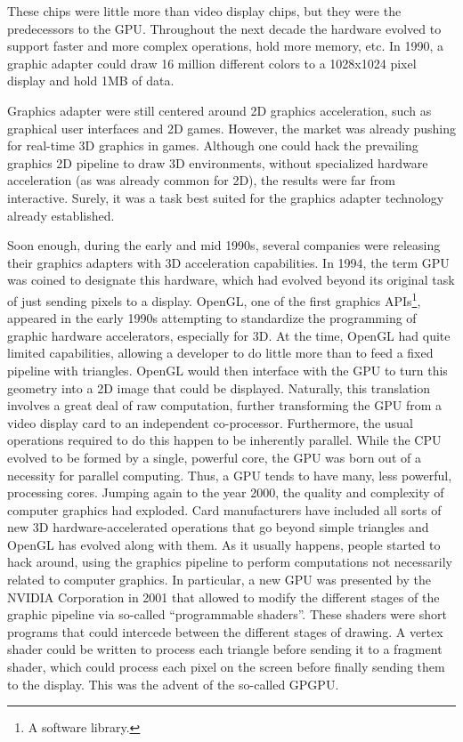 \documentclass[twoside,openright,titlepage,numbers=noenddot,%
headinclude,footinclude,cleardoublepage=empty,abstract=on,
BCOR=5mm,fontsize=11pt, dvipsnames, paper=b5
]{scrreprt}
\newcommand{\gpu}{\gls{GPU}\xspace}
\begin{document}
These chips were little more than video display chips, but they were the predecessors to the \gpu.
Throughout the next decade the hardware evolved to support faster and more complex operations, hold more memory, etc. In 1990, a graphic adapter could draw 16 million different colors to a 1028x1024 pixel display and hold 1MB of data.

Graphics adapter were still centered around 2D graphics acceleration, such as graphical user interfaces and 2D games. However, the market was already pushing for real-time 3D graphics in games. Although one could hack the prevailing graphics 2D pipeline to draw 3D environments, without specialized hardware acceleration (as was already common for 2D), the results were far from interactive. Surely, it was a task best suited for the graphics adapter technology already established.

Soon enough, during the early and mid 1990s, several companies were releasing their graphics adapters with 3D acceleration capabilities. In 1994, the term \gpu was coined to designate this hardware, which had evolved beyond its original task of just sending pixels to a display.
OpenGL\cite{opengl}, one of the first graphics \glspl{API}\footnote{A software library.}, appeared in the early 1990s attempting to standardize the programming of graphic hardware accelerators, especially for 3D.
At the time, OpenGL had quite limited capabilities, allowing a developer to do little more than to feed a fixed pipeline with triangles. OpenGL would then interface with the \gpu to turn this geometry into a 2D image that could be displayed.
Naturally, this translation involves a great deal of raw computation, further transforming the \gpu from a video display card to an independent co-processor. Furthermore,  the usual operations required to do this happen to be inherently parallel. While the CPU evolved to be formed by a single, powerful core, the \gpu was born out of a necessity for parallel computing. Thus, a \gpu tends to have many, less powerful, processing cores.
Jumping again to the year 2000, the quality and complexity of computer graphics had exploded. Card manufacturers have included all sorts of new 3D hardware-accelerated operations that go beyond simple triangles and OpenGL has evolved along with them. As it usually happens, people started to hack around, using the graphics pipeline to perform computations not necessarily related to computer graphics. In particular, a new \gpu was presented by the NVIDIA Corporation in 2001 that allowed to modify the different stages of the graphic pipeline via so-called ``programmable shaders''. These shaders were short programs that could intercede between the different stages of drawing. A vertex shader could be written to process each triangle before sending it to a fragment shader, which could process each pixel on the screen before finally sending them to the display. This was the advent of the so-called \gls{GPGPU}.
\end{document}
